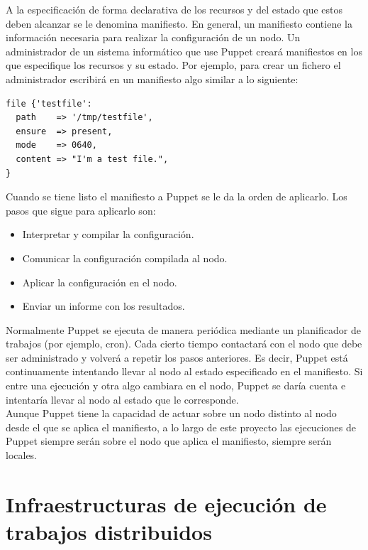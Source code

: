 A la especificación de forma declarativa de los recursos y del estado que estos deben alcanzar se le denomina manifiesto. En general, un manifiesto contiene la información necesaria para realizar la configuración de un nodo. Un administrador de un sistema informático que use Puppet creará manifiestos en los que especifique los recursos y su estado. Por ejemplo, para crear un fichero el administrador escribirá en un manifiesto algo similar a lo siguiente:

\begin{lstlisting}
file {'testfile':
  path    => '/tmp/testfile',
  ensure  => present,
  mode    => 0640,
  content => "I'm a test file.",
}
\end{lstlisting}

Cuando se tiene listo el manifiesto a Puppet se le da la orden de aplicarlo. Los pasos que sigue para aplicarlo son:

\begin{itemize}
\item Interpretar y compilar la configuración.
\item Comunicar la configuración compilada al nodo.
\item Aplicar la configuración en el nodo.
\item Enviar un informe con los resultados.
\end{itemize}


Normalmente Puppet se ejecuta de manera periódica mediante un planificador de trabajos (por ejemplo, cron). Cada cierto tiempo contactará con el nodo que debe ser administrado y volverá a repetir los pasos anteriores. Es decir, Puppet está continuamente intentando llevar al nodo al estado especificado en el manifiesto. Si entre una ejecución y otra algo cambiara en el nodo, Puppet se daría cuenta e intentaría llevar al nodo al estado que le corresponde. \\

Aunque Puppet tiene la capacidad de actuar sobre un nodo distinto al nodo desde el que se aplica el manifiesto, a lo largo de este proyecto las ejecuciones de Puppet siempre serán sobre el nodo que aplica el manifiesto, siempre serán locales.


\section{Infraestructuras de ejecución de trabajos distribuidos}

